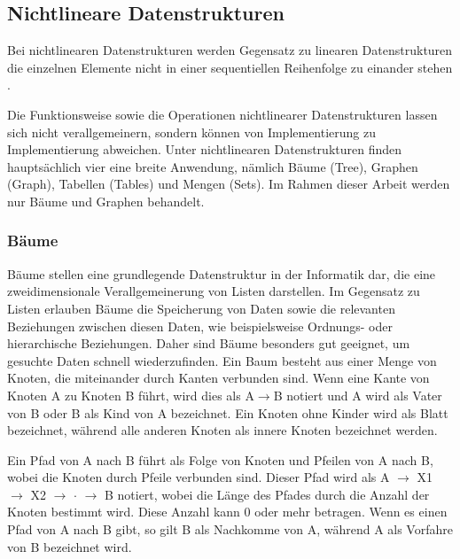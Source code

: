 \subsection{Nichtlineare Datenstrukturen}
Bei nichtlinearen Datenstrukturen werden Gegensatz zu linearen Datenstrukturen die einzelnen Elemente nicht in einer sequentiellen Reihenfolge zu einander stehen \autocite[321]{hoffmann_einfuhrung_2011}. 

Die Funktionsweise sowie die Operationen nichtlinearer Datenstrukturen lassen sich nicht verallgemeinern, sondern können von Implementierung zu Implementierung abweichen. Unter nichtlinearen Datenstrukturen finden hauptsächlich vier eine breite Anwendung, nämlich Bäume (Tree), Graphen (Graph), Tabellen (Tables) und Mengen (Sets). Im Rahmen dieser Arbeit werden nur Bäume und Graphen behandelt.

\subsubsection{Bäume}
Bäume stellen eine grundlegende Datenstruktur in der Informatik dar, die eine zweidimensionale Verallgemeinerung von Listen darstellen. Im Gegensatz zu Listen erlauben Bäume die Speicherung von Daten sowie die relevanten Beziehungen zwischen diesen Daten, wie beispielsweise Ordnungs- oder hierarchische Beziehungen. Daher sind Bäume besonders gut geeignet, um gesuchte Daten schnell wiederzufinden. Ein Baum besteht aus einer Menge von Knoten, die miteinander durch Kanten verbunden sind. Wenn eine Kante von Knoten A zu Knoten B führt, wird dies als A$\rightarrow$B notiert und A wird als Vater von B oder B als Kind von A bezeichnet. Ein Knoten ohne Kinder wird als Blatt bezeichnet, während alle anderen Knoten als innere Knoten bezeichnet werden. \autocite[389]{gumm_band_2016}

Ein Pfad von A nach B führt als Folge von Knoten und Pfeilen von A nach B, wobei die Knoten durch Pfeile verbunden sind. Dieser Pfad wird als A $\rightarrow$ X1 $\rightarrow$ X2 $\rightarrow$ $\cdot$ $\rightarrow$ B notiert, wobei die Länge des Pfades durch die Anzahl der Knoten bestimmt wird. Diese Anzahl kann 0 oder mehr betragen. Wenn es einen Pfad von A nach B gibt, so gilt B als Nachkomme von A, während A als Vorfahre von B bezeichnet wird. \autocite[389]{gumm_band_2016}

